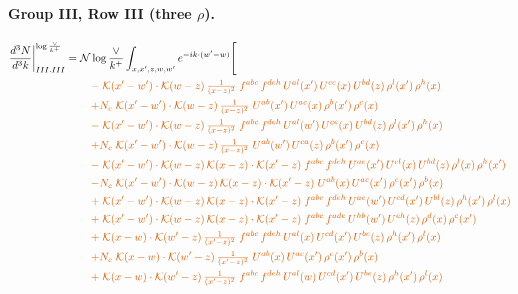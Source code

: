\documentclass[10pt]{article}
\numberwithin{equation}{section}
\newcommand{\NNv}{\mathcal N\log\frac{\vee}{k^+}}
\begin{document}
\paragraph{Group III, Row III (three $\rho$).}
\begin{align}
\frac{d^3N}{d^3k}\bigg|^{\log\frac{\vee}{k^+}}_{III.III}={}&\NNv\int_{x,x',z,w,w'}e^{-ik\cdot(w'-w)}\Bigg[\notag\\
&\quad{\color{BFK}-\;\mathcal{K}(x'-w')\cdot\mathcal{K}(w-z)\,\tfrac{1}{(x-z)^{2}}\;f^{abc}\,f^{deh}\,U^{al}(x')\,U^{ce}(x)\,U^{bd}(z)\,\rho^{l}(x')\,\rho^{h}(x)}\notag\\
&\quad{\color{BFK}+N_c\;\mathcal{K}(x'-w')\cdot\mathcal{K}(w-z)\,\tfrac{1}{(x-z)^{2}}\;U^{ab}(x')\,U^{ac}(x)\,\rho^{b}(x')\,\rho^{c}(x)}\notag\\
&\quad{\color{BFK}-\;\mathcal{K}(x'-w')\cdot\mathcal{K}(w-z)\,\tfrac{1}{(x-z)^{2}}\;f^{abc}\,f^{deh}\,U^{al}(w')\,U^{ce}(x)\,U^{bd}(z)\,\rho^{l}(x')\,\rho^{h}(x)}\notag\\
&\quad{\color{BFK}+N_c\;\mathcal{K}(x'-w')\cdot\mathcal{K}(w-z)\,\tfrac{1}{(x-z)^{2}}\;U^{ab}(w')\,U^{ca}(z)\,\rho^{b}(x')\,\rho^{c}(x)}\notag\\
&\quad{\color{BFK}-\;\mathcal{K}(x'-w')\cdot\mathcal{K}(w-z)\,\mathcal{K}(x-z)\cdot\mathcal{K}(x'-z)\;f^{abc}\,f^{deh}\,U^{ae}(x')\,U^{cl}(x)\,U^{bd}(z)\,\rho^{l}(x)\,\rho^{h}(x')}\notag\\
&\quad{\color{BFK}-N_c\;\mathcal{K}(x'-w')\cdot\mathcal{K}(w-z)\,\mathcal{K}(x-z)\cdot\mathcal{K}(x'-z)\;U^{ab}(x)\,U^{ac}(x')\,\rho^{c}(x')\,\rho^{b}(x)}\notag\\
&\quad{\color{BFK}+\;\mathcal{K}(x'-w')\cdot\mathcal{K}(w-z)\,\mathcal{K}(x-z)\cdot\mathcal{K}(x'-z)\;f^{abc}\,f^{deh}\,U^{ae}(w')\,U^{cd}(x')\,U^{bl}(z)\,\rho^{h}(x')\,\rho^{l}(x)}\notag\\
&\quad{\color{BFK}+\;\mathcal{K}(x'-w')\cdot\mathcal{K}(w-z)\,\mathcal{K}(x-z)\cdot\mathcal{K}(x'-z)\;f^{abc}\,f^{ade}\,U^{hb}(w')\,U^{eh}(z)\,\rho^{d}(x)\,\rho^{c}(x')}\notag\\
&\quad{\color{BFK}+\;\mathcal{K}(x-w)\cdot\mathcal{K}(w'-z)\,\tfrac{1}{(x'-z)^{2}}\;f^{abc}\,f^{deh}\,U^{al}(x)\,U^{cd}(x')\,U^{be}(z)\,\rho^{h}(x')\,\rho^{l}(x)}\notag\\
&\quad{\color{BFK}+N_c\;\mathcal{K}(x-w)\cdot\mathcal{K}(w'-z)\,\tfrac{1}{(x'-z)^{2}}\;U^{ab}(x)\,U^{ac}(x')\,\rho^{c}(x')\,\rho^{b}(x)}\notag\\
&\quad{\color{BFK}+\;\mathcal{K}(x-w)\cdot\mathcal{K}(w'-z)\,\tfrac{1}{(x'-z)^{2}}\;f^{abc}\,f^{deh}\,U^{al}(w)\,U^{cd}(x')\,U^{be}(z)\,\rho^{h}(x')\,\rho^{l}(x)}\notag\\

\end{align}
\end{document}
